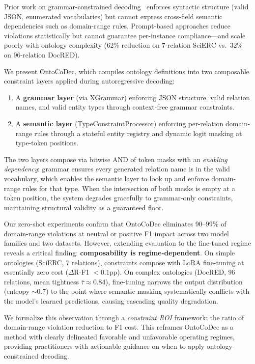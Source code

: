 \documentclass[11pt,a4paper]{article}
\newcommand{\system}{OntoCoDec}
\newcommand{\tight}{\tau}
\begin{document}
Prior work on grammar-constrained decoding~\cite{willard2023efficient,dong2024xgrammar} enforces syntactic structure (valid JSON, enumerated vocabularies) but cannot express cross-field semantic dependencies such as domain-range rules. Prompt-based approaches reduce violations statistically but cannot guarantee per-instance compliance---and scale poorly with ontology complexity (62\% reduction on 7-relation SciERC vs.\ 32\% on 96-relation DocRED).

We present \system{}, which compiles ontology definitions into two composable constraint layers applied during autoregressive decoding:
\begin{enumerate}
    \item A \textbf{grammar layer} (via XGrammar) enforcing JSON structure, valid relation names, and valid entity types through context-free grammar constraints.
    \item A \textbf{semantic layer} (TypeConstraintProcessor) enforcing per-relation domain-range rules through a stateful entity registry and dynamic logit masking at type-token positions.
\end{enumerate}

The two layers compose via bitwise AND of token masks with an \emph{enabling dependency}: grammar ensures every generated relation name is in the valid vocabulary, which enables the semantic layer to look up and enforce domain-range rules for that type. When the intersection of both masks is empty at a token position, the system degrades gracefully to grammar-only constraints, maintaining structural validity as a guaranteed floor.

Our zero-shot experiments confirm that \system{} eliminates 90--99\% of domain-range violations at neutral or positive F1 impact across two model families and two datasets. However, extending evaluation to the fine-tuned regime reveals a critical finding: \textbf{composability is regime-dependent}. On simple ontologies (SciERC, 7 relations), constraints compose with LoRA fine-tuning at essentially zero cost ($\Delta$R-F1 $< 0.1$pp). On complex ontologies (DocRED, 96 relations, mean tightness $\bar{\tight} \approx 0.84$), fine-tuning narrows the output distribution (entropy $\sim$0.7) to the point where semantic masking systematically conflicts with the model's learned predictions, causing cascading quality degradation.

We formalize this observation through a \emph{constraint ROI} framework: the ratio of domain-range violation reduction to F1 cost. This reframes \system{} as a method with clearly delineated favorable and unfavorable operating regimes, providing practitioners with actionable guidance on when to apply ontology-constrained decoding.
\end{document}
